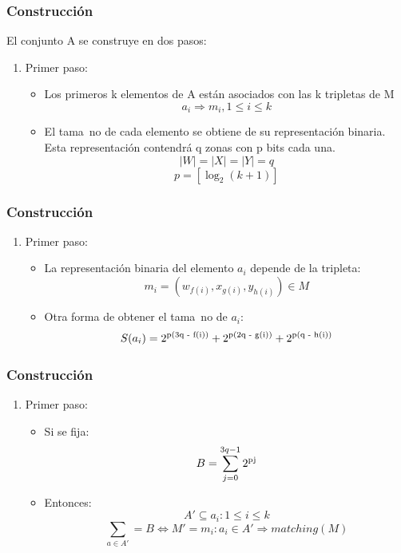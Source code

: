 \documentclass{beamer}
\begin{document}

\begin{frame}
\frametitle{Construcci\'on}
El conjunto A se construye en dos pasos:
\begin{enumerate}
\item Primer paso:
\begin{itemize}
\item Los primeros k elementos de A est\'an asociados con las k tripletas de M
$$ a_{i} \Rightarrow m_{i}, 1 \leq i \leq k $$
\item El tama~{n}o de cada elemento se obtiene de su representaci\'on binaria. Esta representaci\'on contendr\'a q zonas con p bits cada una.
$$ |W| = |X| = |Y| = q $$
$$p = [\log_2(k + 1)]$$
\end{itemize}

\end{enumerate}

\end{frame}


\begin{frame}
\frametitle{Construcci\'on}
\begin{enumerate}
\item Primer paso:
\begin{itemize}
\item La representaci\'on binaria del elemento $a_{i}$ depende de la tripleta:
$$m_{i} = (w_{f(i)}, x_{g(i)}, y_{h(i)}) \in M$$
\item Otra forma de obtener el tama~{n}o de $a_{i}$:
$$S(a_{i}) = 2\textsuperscript{p(3q - f(i))} + 2\textsuperscript{p(2q - g(i))} + 2\textsuperscript{p(q - h(i))}$$
\end{itemize}

\end{enumerate}

\end{frame}


\begin{frame}
\frametitle{Construcci\'on}
\begin{enumerate}
\item Primer paso:
\begin{itemize}
\item Si se fija:
$$B = \sum\limits_{j=0}^{3q -1} 2\textsuperscript{pj}$$
\item Entonces:
$$A'\subseteq {a_{i}: 1 \leq i \leq k}$$
$$\sum\limits_{a\in A'} = B \iff M' = {m_{i}: a_{i} \in A' \Rightarrow matching(M)}$$
\end{itemize}

\end{enumerate}

\end{frame}
\end{document}
